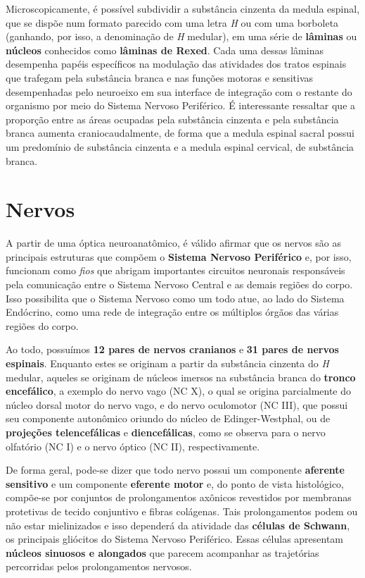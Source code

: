 \documentclass[
]{book}
\begin{document}
Microscopicamente, é possível subdividir a substância cinzenta da medula espinal, que se dispõe num formato parecido com uma letra \emph{H} ou com uma borboleta (ganhando, por isso, a denominação de \emph{H} medular), em uma série de \textbf{lâminas} ou \textbf{núcleos} conhecidos como \textbf{lâminas de Rexed}. Cada uma dessas lâminas desempenha papéis específicos na modulação das atividades dos tratos espinais que trafegam pela substância branca e nas funções motoras e sensitivas desempenhadas pelo neuroeixo em sua interface de integração com o restante do organismo por meio do Sistema Nervoso Periférico. É interessante ressaltar que a proporção entre as áreas ocupadas pela substância cinzenta e pela substância branca aumenta craniocaudalmente, de forma que a medula espinal sacral possui um predomínio de substância cinzenta e a medula espinal cervical, de substância branca.

\hypertarget{nervos}{%
\chapter{Nervos}\label{nervos}}

A partir de uma óptica neuroanatômico, é válido afirmar que os nervos são as principais estruturas que compõem o \textbf{Sistema Nervoso Periférico} e, por isso, funcionam como \emph{fios} que abrigam importantes circuitos neuronais responsáveis pela comunicação entre o Sistema Nervoso Central e as demais regiões do corpo. Isso possibilita que o Sistema Nervoso como um todo atue, ao lado do Sistema Endócrino, como uma rede de integração entre os múltiplos órgãos das várias regiões do corpo.

Ao todo, possuímos \textbf{12 pares de nervos cranianos} e \textbf{31 pares de nervos espinais}. Enquanto estes se originam a partir da substância cinzenta do \emph{H} medular, aqueles se originam de núcleos imersos na substância branca do \textbf{tronco encefálico}, a exemplo do nervo vago (NC X), o qual se origina parcialmente do núcleo dorsal motor do nervo vago, e do nervo oculomotor (NC III), que possui seu componente autonômico oriundo do núcleo de Edinger-Westphal, ou de \textbf{projeções telencefálicas} e \textbf{diencefálicas}, como se observa para o nervo olfatório (NC I) e o nervo óptico (NC II), respectivamente.

De forma geral, pode-se dizer que todo nervo possui um componente \textbf{aferente sensitivo} e um componente \textbf{eferente motor} e, do ponto de vista histológico, compõe-se por conjuntos de prolongamentos axônicos revestidos por membranas protetivas de tecido conjuntivo e fibras colágenas. Tais prolongamentos podem ou não estar mielinizados e isso dependerá da atividade das \textbf{células de Schwann}, os principais gliócitos do Sistema Nervoso Periférico. Essas células apresentam \textbf{núcleos sinuosos e alongados} que parecem acompanhar as trajetórias percorridas pelos prolongamentos nervosos.
\end{document}
